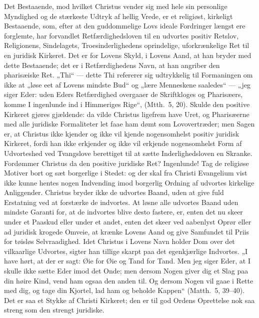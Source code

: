 \documentclass[12pt]{book}
\begin{document}
Det Bestaaende, mod hvilket Christus vender sig med hele sin
personlige Myndighed og de stærkeste Udtryk af hellig Vrede, er et
religiøst, kirkeligt Bestaaende, som,
efter at den guddommelige Lovs ideale Fordringer længst ere
forglemte, har forvandlet Retfærdighedsloven til en udvortes positiv
Retslov, Religionens, Sindelagets, Troesinderlighedens oprindelige,
uforkrænkelige Ret til en juridisk Kirkeret. Det er for Lovens
Skyld, i Lovens Aand, at han bryder med dette Bestaaende; det er i
Retfærdighedens Navn, at han angriber den pharisæiske Ret. „Thi“
--- dette Thi refererer sig udtrykkelig til Formaningen om ikke at
„løse eet af Lovens mindste Bud“ og „lære Menneskene saaledes“ ---
„jeg siger Eder: uden Eders Retfærdighed overgaaer de Skriftkloges
og Pharisæers, komme I ingenlunde ind i Himmeriges Rige“,
(Mtth.\ 5, 20). Skulde den positive Kirkeret gjøres gjældende: da
vilde Christus ligefrem have Uret, og Pharisæerne med alle juridiske
Formaliteter let faae ham dømt som Lovovertræder; men Sagen er, at
Christus ikke kjender og ikke vil kjende nogensomhelst positiv
juridisk Kirkeret, fordi han ikke erkjender og ikke vil erkjende
nogensomhelst Form af Udvorteshed ved Tvangslove berettiget til at
sætte Inderlighedsloven en Skranke. Fordømmer Christus da den
positive juridiske Ret? Ingenlunde! Tag de religiøse Motiver bort og
sæt borgerlige i Stedet: og der skal fra Christi Evangelium vist
ikke kunne hentes nogen Indvending imod borgerlig Ordning af
udvortes kirkelige Anliggender. Christus bryder ikke de udvortes
Baand, uden at give fuld Erstatning ved at forstærke de indvortes.
At løsne alle udvortes Baand uden mindste Garanti for, at de
indvortes blive desto fastere, er, enten det nu skeer under et
Paaskud eller under et andet, enten det skeer ved aabenlyst Oprør
eller ad juridisk krogede Omveie, at krænke Lovens Aand og give
Samfundet til Priis for tøisløs Selvraadighed. Idet Christus i
Lovens Navn holder Dom over det vilkaarlige Udvortes, sigter han
tillige skarpt paa det egenkjærlige Indvortes. „I have hørt, at der
er sagt: Øie for Øie og Tand for Tand. Men jeg siger
Eder, at I skulle ikke sætte Eder imod det Onde; men dersom Nogen
giver dig et Slag paa din høire Kind, vend ham ogsaa den anden til.
Og dersom Nogen vil gaae i Rette med dig, og tage din Kjortel, lad
ham og beholde Kappen“ (Matth.\ 5, 39--40).
Det er saa et Stykke
af Christi Kirkeret; den er til god Ordens Oprettelse nok saa streng
som den strengt juridiske.
\end{document}
